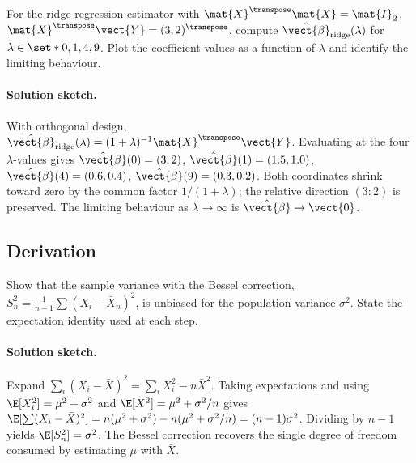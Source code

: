 \begin{exercise}
For the ridge regression estimator with $\mat{X}^{\transpose}\mat{X}
= \mat{I}_{2}$, $\mat{X}^{\transpose}\vect{Y} = (3, 2)^{\transpose}$,
compute $\hat{\vect{\beta}}_{\mathrm{ridge}}(\lambda)$ for $\lambda
\in \set*{0, 1, 4, 9}$. Plot the coefficient values as a function
of $\lambda$ and identify the limiting behaviour.

\paragraph{Solution sketch.} With orthogonal design,
$\hat{\vect{\beta}}_{\mathrm{ridge}}(\lambda) = (1+\lambda)^{-1}
\mat{X}^{\transpose}\vect{Y}$. Evaluating at the four
$\lambda$-values gives $\hat{\vect{\beta}}(0) = (3, 2)$,
$\hat{\vect{\beta}}(1) = (1.5, 1.0)$, $\hat{\vect{\beta}}(4) =
(0.6, 0.4)$, $\hat{\vect{\beta}}(9) = (0.3, 0.2)$. Both
coordinates shrink toward zero by the common factor
$1/(1+\lambda)$; the relative direction $(3:2)$ is preserved.
The limiting behaviour as $\lambda \to \infty$ is
$\hat{\vect{\beta}} \to \vect{0}$.
\end{exercise}

\subsection*{Derivation}

\begin{exercise}
Show that the sample variance with the Bessel correction,
$S_{n}^{2} = \frac{1}{n-1}\sum (X_{i} - \bar{X}_{n})^{2}$, is
unbiased for the population variance $\sigma^{2}$. State the
expectation identity used at each step.

\paragraph{Solution sketch.} Expand
$\sum_{i}(X_{i} - \bar{X})^{2} = \sum_{i} X_{i}^{2} - n\bar{X}^{2}$.
Taking expectations and using $\E[X_{i}^{2}] = \mu^{2} + \sigma^{2}$
and $\E[\bar{X}^{2}] = \mu^{2} + \sigma^{2}/n$ gives
$\E[\sum (X_{i} - \bar{X})^{2}] = n(\mu^{2} + \sigma^{2}) - n(\mu^{2}
+ \sigma^{2}/n) = (n-1)\sigma^{2}$. Dividing by $n-1$ yields
$\E[S_{n}^{2}] = \sigma^{2}$. The Bessel correction recovers the
single degree of freedom consumed by estimating $\mu$ with
$\bar{X}$.
\end{exercise}


